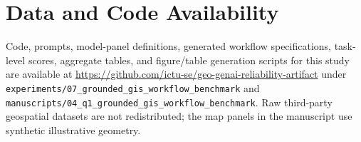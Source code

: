 \documentclass[]{interact}
\begin{document}
\section*{Data and Code Availability}

Code, prompts, model-panel definitions, generated workflow specifications, task-level scores, aggregate tables, and figure/table generation scripts for this study are available at \url{https://github.com/ictu-se/geo-genai-reliability-artifact} under \texttt{experiments/07\_grounded\_gis\_workflow\_benchmark} and \texttt{manuscripts/04\_q1\_grounded\_gis\_workflow\_benchmark}. Raw third-party geospatial datasets are not redistributed; the map panels in the manuscript use synthetic illustrative geometry.



\end{document}
